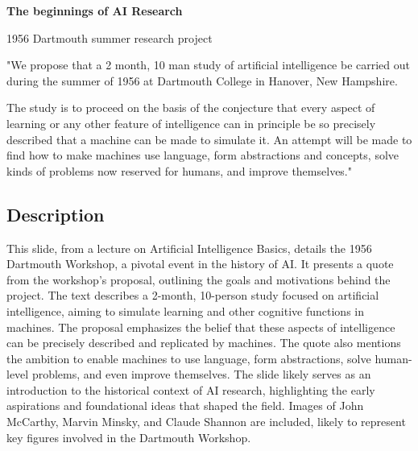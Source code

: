 \documentclass{article}%
\begin{document}
\textbf{The beginnings of AI Research}

1956 Dartmouth summer research project

"We propose that a 2 month, 10 man study of artificial
intelligence be carried out during the summer of
1956 at Dartmouth College in Hanover, New
Hampshire.

The study is to proceed on the basis of the conjecture
that every aspect of learning or any other feature of
intelligence can in principle be so precisely described
that a machine can be made to simulate it. An attempt
will be made to find how to make machines use
language, form abstractions and concepts, solve
kinds of problems now reserved for humans, and
improve themselves."
%
\subsection{Description}%
This slide, from a lecture on Artificial Intelligence Basics, details the 1956 Dartmouth Workshop, a pivotal event in the history of AI.  It presents a quote from the workshop's proposal, outlining the goals and motivations behind the project.  The text describes a 2-month, 10-person study focused on artificial intelligence, aiming to simulate learning and other cognitive functions in machines.  The proposal emphasizes the belief that these aspects of intelligence can be precisely described and replicated by machines.  The quote also mentions the ambition to enable machines to use language, form abstractions, solve human-level problems, and even improve themselves.  The slide likely serves as an introduction to the historical context of AI research, highlighting the early aspirations and foundational ideas that shaped the field.  Images of John McCarthy, Marvin Minsky, and Claude Shannon are included, likely to represent key figures involved in the Dartmouth Workshop.%
\end{document}
